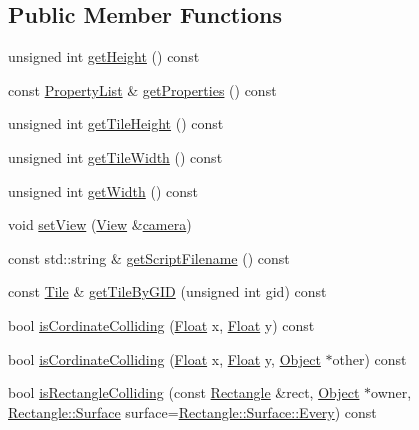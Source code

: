 \subsection*{Public Member Functions}
\begin{DoxyCompactItemize}
\item 
unsigned int \hyperlink{classZeta_1_1Map_abac53fd3dac48523eae38f958246e7a2}{get\+Height} () const 
\item 
const \hyperlink{classZeta_1_1PropertyList}{Property\+List} \& \hyperlink{classZeta_1_1Map_afa58aa638021348a4949a99c86c0bf65}{get\+Properties} () const 
\item 
unsigned int \hyperlink{classZeta_1_1Map_af71bdf85fe3e634ac50db6b978142db4}{get\+Tile\+Height} () const 
\item 
unsigned int \hyperlink{classZeta_1_1Map_a17d30173db304ee800268b25d0a8dece}{get\+Tile\+Width} () const 
\item 
unsigned int \hyperlink{classZeta_1_1Map_a24cb5a26f6e74d10c5f3bbedcb2fdf6f}{get\+Width} () const 
\item 
void \hyperlink{classZeta_1_1Map_a60d8d526121ede30bf298e5bc37ea513}{set\+View} (\hyperlink{classZeta_1_1View}{View} \&\hyperlink{classZeta_1_1Map_a9b9106c7c9476767a019f2a0a6a6e29b}{camera})
\item 
const std\+::string \& \hyperlink{classZeta_1_1Map_a3644cf87a279008dd7c9756e61720453}{get\+Script\+Filename} () const 
\item 
const \hyperlink{classZeta_1_1Tile}{Tile} \& \hyperlink{classZeta_1_1Map_a89a394411081092638efa88f89058f55}{get\+Tile\+By\+G\+I\+D} (unsigned int gid) const 
\item 
bool \hyperlink{classZeta_1_1Map_a5e0e65bb558ba450a0b15d8619e596b1}{is\+Cordinate\+Colliding} (\hyperlink{namespaceZeta_a1e0a1265f9b3bd3075fb0fabd39088ba}{Float} x, \hyperlink{namespaceZeta_a1e0a1265f9b3bd3075fb0fabd39088ba}{Float} y) const 
\item 
bool \hyperlink{classZeta_1_1Map_a337efdfa761e96d37f4b50c9c717e623}{is\+Cordinate\+Colliding} (\hyperlink{namespaceZeta_a1e0a1265f9b3bd3075fb0fabd39088ba}{Float} x, \hyperlink{namespaceZeta_a1e0a1265f9b3bd3075fb0fabd39088ba}{Float} y, \hyperlink{classZeta_1_1Object}{Object} $\ast$other) const 
\item 
bool \hyperlink{classZeta_1_1Map_aa891631eb5263b1a7fdf8474d042ce07}{is\+Rectangle\+Colliding} (const \hyperlink{classZeta_1_1Rectangle}{Rectangle} \&rect, \hyperlink{classZeta_1_1Object}{Object} $\ast$owner, \hyperlink{classZeta_1_1Rectangle_a04ae0d4d037f13e313b042bff55c5f62}{Rectangle\+::\+Surface} surface=\hyperlink{classZeta_1_1Rectangle_a04ae0d4d037f13e313b042bff55c5f62affcf70e892b8ac3facbac0f88602396b}{Rectangle\+::\+Surface\+::\+Every}) const 

\end{DoxyCompactItemize}
